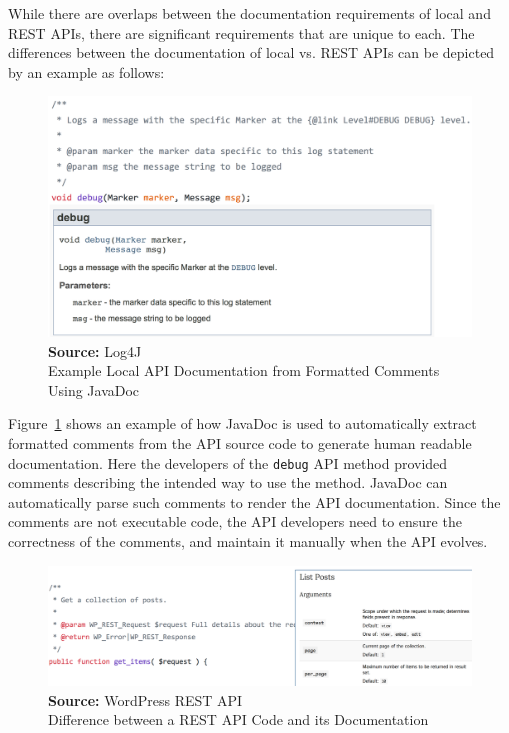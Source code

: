 While there are overlaps between the documentation requirements of local and REST APIs, there are significant requirements that are unique to each. The differences between the documentation
of local vs. REST APIs can be depicted by an example as follows:
\newcommand*{\captionsource}[2]{%
  \caption[{#1}]{%
    \textbf{Source:} #2%
    \\\hspace{\linewidth}%
    #1%
  }%
}
\begin{figure}[htb]
  \includegraphics[width=\linewidth]{javadoc.png}
  \captionsource{Example Local API Documentation from Formatted Comments Using JavaDoc}{Log4J}
  \label{fig:javadoc}
\end{figure}



Figure~\ref{fig:javadoc} shows an example of how JavaDoc is used to automatically extract formatted comments from the API source code to
generate human readable documentation. Here the developers of the \texttt{debug} API method provided comments describing the intended way to use the method. JavaDoc can
automatically parse such comments to render the API documentation. Since the comments are not executable code, the API developers need to ensure the correctness of the
comments, and maintain it manually when the API evolves.

\begin{figure}[htb]
  \includegraphics[width=\linewidth]{wordpress_doc.png}
  \captionsource{Difference between a REST API Code and its Documentation}{WordPress REST API}
  \label{fig:wordpress_doc}
\end{figure}


